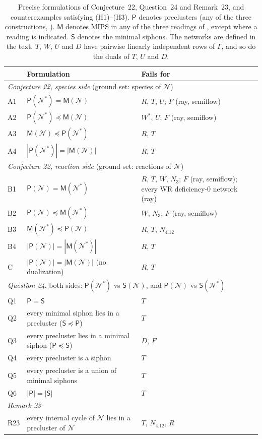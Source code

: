 \documentclass[11pt,a4paper]{report}
\newcommand{\Net}{\mathcal{N}}
\newcommand{\Pre}{\mathsf{P}}
\newcommand{\Mips}{\mathsf{M}}
\newcommand{\Sip}{\mathsf{S}}
\newcommand{\refi}{\preceq}
\begin{document}
\begin{table}[ht]
\centering
\caption{Precise formulations of Conjecture~22, Question~24 and Remark~23, and counterexamples satisfying (H1)--(H3).
\(\Pre\) denotes preclusters (any of the three constructions, ). \(\Mips\) denotes MIPS in any
of the three readings of , except where a reading is indicated. \(\Sip\) denotes the minimal
siphons. The networks are defined in the text. \(T\), \(W\), \(U\) and \(D\) have pairwise linearly independent rows
of \(\Gamma\), and so do the duals of \(T\), \(U\) and \(D\).}\label{tab:formulations}
\small
\begin{tabular}{p{0.6cm}>{\raggedright\arraybackslash}p{7.6cm}>{\raggedright\arraybackslash}p{4.6cm}}
\hline
& Formulation & Fails for \\
\hline
\multicolumn{3}{l}{\emph{Conjecture 22, species side} (ground set: species of \(\Net\))}\\
A1 & \(\Pre(\Net^*)=\Mips(\Net)\) & \(R\), \(T\), \(U\); \(F\) (ray, semiflow) \\
A2 & \(\Pre(\Net^*)\refi\Mips(\Net)\) & \(W^*\), \(U\); \(F\) (ray, semiflow) \\
A3 & \(\Mips(\Net)\refi\Pre(\Net^*)\) & \(R\), \(T\) \\
A4 & \(|\Pre(\Net^*)|=|\Mips(\Net)|\) & \(R\), \(T\) \\
\multicolumn{3}{l}{\emph{Conjecture 22, reaction side} (ground set: reactions of \(\Net\))}\\
B1 & \(\Pre(\Net)=\Mips(\Net^*)\) & \(R\), \(T\), \(W\), \(N_3\); \(F\) (ray, semiflow); every WR deficiency-0 network (ray) \\
B2 & \(\Pre(\Net)\refi\Mips(\Net^*)\) & \(W\), \(N_3\); \(F\) (ray, semiflow) \\
B3 & \(\Mips(\Net^*)\refi\Pre(\Net)\) & \(R\), \(T\), \(N_{4.12}\) \\
B4 & \(|\Pre(\Net)|=|\Mips(\Net^*)|\) & \(R\), \(T\) \\
C & \(|\Pre(\Net)|=|\Mips(\Net)|\) (no dualization) & \(R\), \(T\) \\
\multicolumn{3}{l}{\emph{Question 24}, both sides: \(\Pre(\Net^*)\) vs \(\Sip(\Net)\), and \(\Pre(\Net)\) vs \(\Sip(\Net^*)\)}\\
Q1 & \(\Pre=\Sip\) & \(T\) \\
Q2 & every minimal siphon lies in a precluster (\(\Sip\refi\Pre\)) & \(T\) \\
Q3 & every precluster lies in a minimal siphon (\(\Pre\refi\Sip\)) & \(D\), \(F\) \\
Q4 & every precluster is a siphon & \(T\) \\
Q5 & every precluster is a union of minimal siphons & \(T\) \\
Q6 & \(|\Pre|=|\Sip|\) & \(T\) \\
\multicolumn{3}{l}{\emph{Remark 23}}\\
R23 & every internal cycle of \(\Net\) lies in a precluster of \(\Net\) & \(T\), \(N_{4.12}\), \(R\) \\
\hline
\end{tabular}
\end{table}
\end{document}
